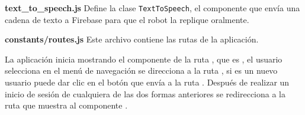 \textbf{text\_to\_speech.js}
\label{\detokenize{code_docs:text-to-speech-js}}
Define la clase \texttt{TextToSpeech}, el componente que envía una cadena de texto a Firebase para que el robot la
replique oralmente.

\textbf{constants/routes.js}
\label{\detokenize{code_docs:constants}}
Este archivo contiene las rutas de la aplicación.

%
\begin{sphinxVerbatim}[commandchars=\\\{\}]
    
    
    
    
\end{sphinxVerbatim}


La aplicación inicia mostrando el componente de la ruta , que es
, el usuario selecciona  en el menú de navegación
se direcciona a la ruta , si es un nuevo usuario puede dar clic
en el botón que envía a la ruta . Después de realizar un inicio de
sesión de cualquiera de las dos formas anteriores se redirecciona a la ruta
 que muestra al componente .

